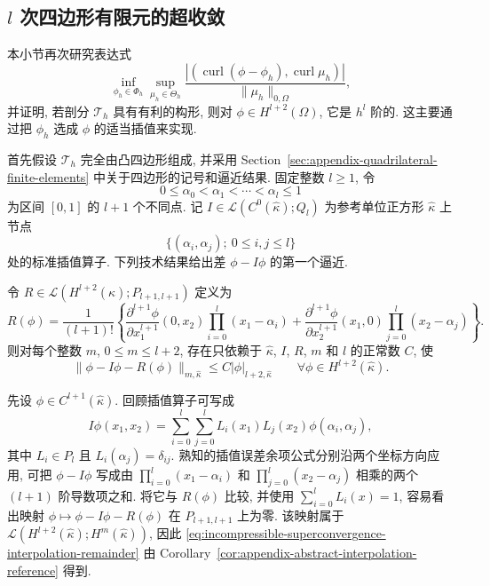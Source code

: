 \subsection{$l$ 次四边形有限元的超收敛}
\label{subsec:incompressible-quadrilateral-superconvergence}

本小节再次研究表达式
\[
\inf_{\phi_h\in\Phi_h}
\sup_{\mu_h\in\Theta_h}
\frac{|(\operatorname{curl}(\phi-\phi_h),
\operatorname{curl}\mu_h)|}{\|\mu_h\|_{0,\Omega}},
\]
并证明, 若剖分 $\mathcal T_h$ 具有有利的构形,
则对 $\phi\in H^{l+2}(\Omega)$, 它是 $h^l$ 阶的.
这主要通过把 $\phi_h$ 选成 $\phi$ 的适当插值来实现.

首先假设 $\mathcal T_h$ 完全由凸四边形组成,
并采用 Section~\ref{sec:appendix-quadrilateral-finite-elements}
中关于四边形的记号和逼近结果.
固定整数 $l\geq1$, 令
\[
0\leq\alpha_0<\alpha_1<\cdots<\alpha_l\leq1
\]
为区间 $[0,1]$ 的 $l+1$ 个不同点.
记 $I\in\mathcal L(C^0(\widehat\kappa);Q_l)$
为参考单位正方形 $\widehat\kappa$ 上节点
\[
\{(\alpha_i,\alpha_j);\ 0\leq i,j\leq l\}
\]
处的标准插值算子.
下列技术结果给出差 $\phi-I\phi$ 的第一个逼近.

\begin{Lemma}\label{lem:incompressible-superconvergence-interpolation-remainder}
令 $R\in\mathcal L(H^{l+2}(\widehat\kappa);P_{l+1,l+1})$ 定义为
\[
R(\phi)=\frac1{(l+1)!}
\left\{
\frac{\partial^{l+1}\phi}{\partial x_1^{l+1}}(0,x_2)
\prod_{i=0}^l(x_1-\alpha_i)
+\frac{\partial^{l+1}\phi}{\partial x_2^{l+1}}(x_1,0)
\prod_{j=0}^l(x_2-\alpha_j)
\right\}.
\]
则对每个整数 $m$, $0\leq m\leq l+2$,
存在只依赖于 $\widehat\kappa$, $I$, $R$, $m$ 和 $l$ 的正常数 $C$, 使
\begin{equation}\label{eq:incompressible-superconvergence-interpolation-remainder}
\|\phi-I\phi-R(\phi)\|_{m,\widehat\kappa}
\leq C|\phi|_{l+2,\widehat\kappa}
\qquad\forall\phi\in H^{l+2}(\widehat\kappa).
\end{equation}
\end{Lemma}

\begin{Proof}
先设 $\phi\in C^{l+1}(\widehat\kappa)$.
回顾插值算子可写成
\[
I\phi(x_1,x_2)
=\sum_{i=0}^l\sum_{j=0}^l
L_i(x_1)L_j(x_2)\phi(\alpha_i,\alpha_j),
\]
其中 $L_i\in P_l$ 且 $L_i(\alpha_j)=\delta_{ij}$.
熟知的插值误差余项公式分别沿两个坐标方向应用,
可把 $\phi-I\phi$ 写成由
$\prod_{i=0}^l(x_1-\alpha_i)$ 和
$\prod_{j=0}^l(x_2-\alpha_j)$ 相乘的两个
$(l+1)$ 阶导数项之和.
将它与 $R(\phi)$ 比较, 并使用
$\sum_{i=0}^lL_i(x)=1$, 容易看出映射
$\phi\mapsto\phi-I\phi-R(\phi)$ 在 $P_{l+1,l+1}$ 上为零.
该映射属于
$\mathcal L(H^{l+2}(\widehat\kappa);H^m(\widehat\kappa))$,
因此 \eqref{eq:incompressible-superconvergence-interpolation-remainder}
由 Corollary~\ref{cor:appendix-abstract-interpolation-reference} 得到.
\end{Proof}

